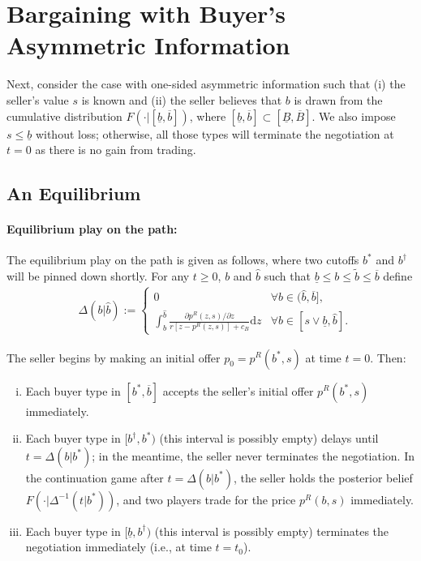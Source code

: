 \section{Bargaining with Buyer's Asymmetric Information}
\label{ss:one_sided_buyer}


Next, consider the case with one-sided asymmetric information such that (i) the seller's value $s$ is known and (ii) the seller believes that $b$ is drawn from the cumulative distribution $F(\cdot | [\underline b,\overline b])$, 
where $[\underline b, \overline b]\subset [\underline B, \overline B]$. We also impose $s\leq \underline b$ without loss; otherwise, all those types will terminate the negotiation at $t=0$ as there is no gain from trading.

\subsection{An Equilibrium}

 


\paragraph{Equilibrium play on the path:} 
The equilibrium play on the path is given as follows, where two cutoffs $b^*$ and $b^\dagger$ will be pinned down shortly. For any $t\geq 0$, $b$ and $\hat b$ such that $\underline b\leq b\leq \tilde b \leq\overline b$ define
    \begin{align}\label{eq:Delta}
    &\Delta (b|\hat b):= 
    \left\{
    \begin{array}{cl}\displaystyle
    0 & \forall b\in(\hat b, \overline b],
    \\[10pt]
    \displaystyle 
    \int_b^{\hat b} \frac{\partial p^R(z,s)/\partial z}{r[z-p^R(z,s)]+c_B}\text{d}z
	& \forall b\in[s\vee \underline b, \hat b]. 
    \end{array}\right.
  \end{align}

The seller begins by making an initial offer $p_0=p^R(b^*,s)$ at time $t=0$. Then:
	\begin{enumerate}[(i)]
	\item Each buyer type in $[b^*,\overline b]$ accepts the seller's initial offer $p^R(b^*,s)$ immediately.  
	\item Each buyer type in $[b^\dagger, b^*)$ (this interval is possibly empty) delays until $t=\Delta (b|b^*)$; in the meantime, the seller never terminates the negotiation. 
    In the continuation game after $t=\Delta (b|b^*)$, the seller holds the posterior belief $F(\cdot|{\Delta^{-1}(t|b^*)})$, and two players trade for the price $p^R(b,s)$ immediately.

  \item Each buyer type in $[\underline b, b^\dagger)$ (this interval is possibly empty) terminates the negotiation immediately (i.e., at time $t=t_0$). 
\end{enumerate}

